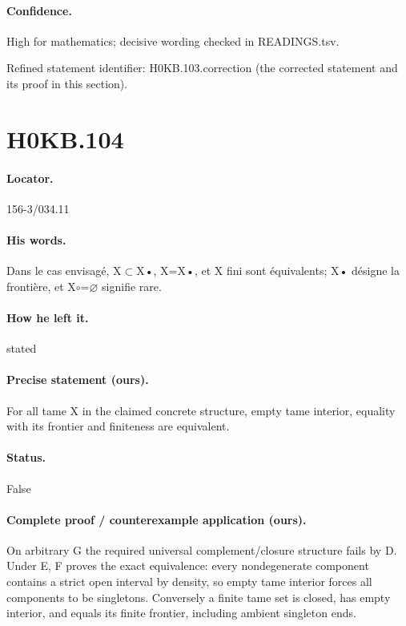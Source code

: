 \paragraph{Confidence.} High for mathematics; decisive wording checked in READINGS.tsv.

\noindent Refined statement identifier: H0KB.103.correction (the corrected statement and its proof in this section).

\section*{H0KB.104}\label{statement:H0KB.104}
\paragraph{Locator.} 156-3/034.11

\paragraph{His words.} Dans le cas envisagé, X\ensuremath{\subset}X•, X=X•, et X fini sont équivalents; X• désigne la frontière, et X\ensuremath{\circ}=\ensuremath{\varnothing} signifie rare.

\paragraph{How he left it.} stated

\paragraph{Precise statement (ours).} For all tame X in the claimed concrete structure, empty tame interior, equality with its frontier and finiteness are equivalent.

\paragraph{Status.} False

\paragraph{Complete proof / counterexample application (ours).} On arbitrary G the required universal complement/closure structure fails by D. Under E, F proves the exact equivalence: every nondegenerate component contains a strict open interval by density, so empty tame interior forces all components to be singletons. Conversely a finite tame set is closed, has empty interior, and equals its finite frontier, including ambient singleton ends.

